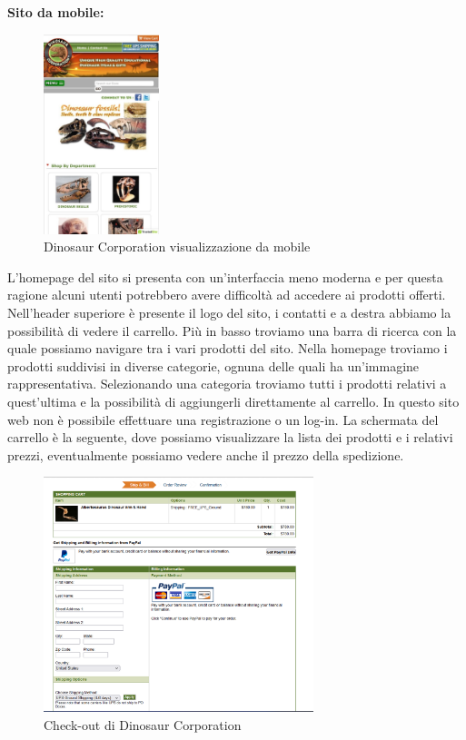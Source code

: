 \textbf{Sito da mobile:}
\begin{figure}[H]
        \centering
        \includegraphics[width=0.3\textwidth]{immagini/dinosaurcorporation_mobile.jpg}
        \caption{Dinosaur Corporation visualizzazione da mobile}
    \end{figure}
L’homepage del sito si presenta con un’interfaccia meno moderna e per questa ragione alcuni utenti potrebbero avere difficoltà ad accedere ai prodotti offerti. Nell’header superiore è presente il logo del sito, i contatti e a destra abbiamo la possibilità di vedere il carrello. Più in basso troviamo una barra di ricerca con la quale possiamo navigare tra i vari prodotti del sito. Nella homepage troviamo i prodotti suddivisi in diverse categorie, ognuna delle quali ha un'immagine rappresentativa. Selezionando una categoria troviamo tutti i prodotti relativi a quest'ultima e la possibilità di aggiungerli direttamente al carrello. In questo sito web non è possibile effettuare una registrazione o un log-in. La schermata del carrello è la seguente, dove possiamo visualizzare la lista dei prodotti e i relativi prezzi, eventualmente possiamo vedere anche il prezzo della spedizione. 
\begin{figure}[H]
        \centering
        \includegraphics[width=0.70\textwidth]{immagini/dinosaur_corporation_checkout.png}
        \caption{Check-out di Dinosaur Corporation }
    \end{figure}
    
